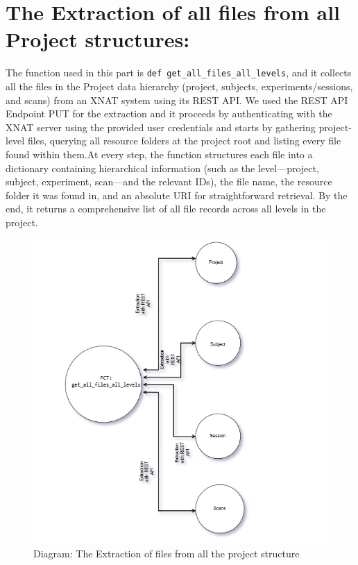 \section{The Extraction of all files from all Project structures:}
The function used in this part is \texttt{def get\_all\_files\_all\_levels}, and it collects all the files in the Project data hierarchy (project, subjects, experiments/sessions, and scans) from an XNAT system using its REST API. We used the REST API Endpoint PUT for the extraction and it proceeds by authenticating with the XNAT server using the provided user credentials and starts by gathering project-level files, querying all resource folders at the project root and listing every file found within them.At every step, the function structures each file into a dictionary containing hierarchical information (such as the level—project, subject, experiment, scan—and the relevant IDs), the file name, the resource folder it was found in, and an absolute URI for straightforward retrieval. By the end, it returns a comprehensive list of all file records across all levels in the project. 

\begin{figure}
    \centering
    \includegraphics[width=0.6\linewidth]{en/content/edf.png}
    \caption{Diagram: The Extraction of files from all the project structure}
    \label{fig:enter-label}
\end{figure}




